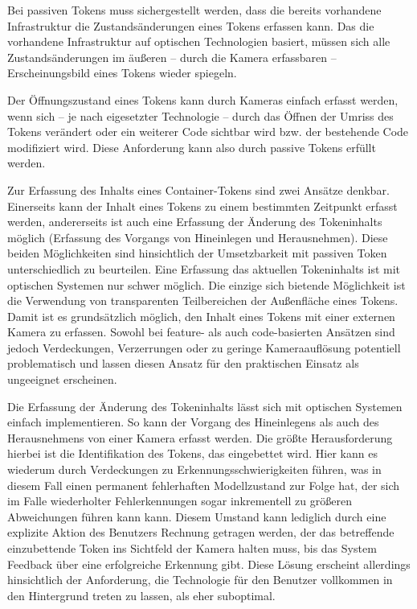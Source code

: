 Bei passiven Tokens muss sichergestellt werden, dass die bereits vorhandene Infrastruktur die Zustandsänderungen eines Tokens erfassen kann. Das die vorhandene Infrastruktur auf optischen Technologien basiert, müssen sich alle Zustandsänderungen im äußeren -- durch die Kamera erfassbaren -- Erscheinungsbild eines Tokens wieder spiegeln.

Der Öffnungszustand eines Tokens kann durch Kameras einfach erfasst werden, wenn sich -- je nach eigesetzter Technologie -- durch das Öffnen der Umriss des Tokens verändert oder ein weiterer Code sichtbar wird bzw. der bestehende Code modifiziert wird. Diese Anforderung kann also durch passive Tokens erfüllt werden.

Zur Erfassung des Inhalts eines Container-Tokens sind zwei Ansätze denkbar. Einerseits kann der Inhalt eines Tokens zu einem bestimmten Zeitpunkt erfasst werden, andererseits ist auch eine Erfassung der Änderung des Tokeninhalts möglich (Erfassung des Vorgangs von Hineinlegen und Herausnehmen). Diese beiden Möglichkeiten sind hinsichtlich der Umsetzbarkeit mit passiven Token unterschiedlich zu beurteilen. Eine Erfassung das aktuellen Tokeninhalts ist mit optischen Systemen nur schwer möglich. Die einzige sich bietende Möglichkeit ist die Verwendung von transparenten Teilbereichen der Außenfläche eines Tokens. Damit ist es grundsätzlich möglich, den Inhalt eines Tokens mit einer externen Kamera zu erfassen. Sowohl bei feature- als auch code-basierten Ansätzen sind jedoch Verdeckungen, Verzerrungen oder zu geringe Kameraauflösung potentiell problematisch und lassen diesen Ansatz für den praktischen Einsatz als ungeeignet erscheinen.

Die Erfassung der Änderung des Tokeninhalts lässt sich mit optischen Systemen einfach implementieren. So kann der Vorgang des Hineinlegens als auch des Herausnehmens von einer Kamera erfasst werden. Die größte Herausforderung hierbei ist die Identifikation des Tokens, das eingebettet wird. Hier kann es wiederum durch Verdeckungen zu Erkennungsschwierigkeiten führen, was in diesem Fall einen permanent fehlerhaften Modellzustand zur Folge hat, der sich im Falle wiederholter Fehlerkennungen sogar inkrementell zu größeren Abweichungen führen kann kann. Diesem Umstand kann lediglich durch eine explizite Aktion des Benutzers Rechnung getragen werden, der das betreffende einzubettende Token ins Sichtfeld der Kamera halten muss, bis das System Feedback über eine erfolgreiche Erkennung gibt. Diese Lösung erscheint allerdings hinsichtlich der Anforderung, die Technologie für den Benutzer vollkommen in den Hintergrund treten zu lassen, als eher suboptimal.

